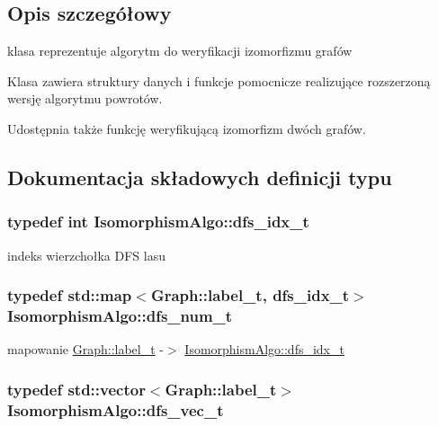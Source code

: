 \subsection{Opis szczegółowy}
klasa reprezentuje algorytm do weryfikacji izomorfizmu grafów 

Klasa zawiera struktury danych i funkcje pomocnicze realizujące rozszerzoną wersję algorytmu powrotów.

Udostępnia także funkcję weryfikującą izomorfizm dwóch grafów. 

\subsection{Dokumentacja składowych definicji typu}
\hypertarget{classIsomorphismAlgo_ab4ec6489271a99fae3bd2476b22ef35b}{
\subsubsection[{dfs\-\_\-idx\-\_\-t}]{\setlength{\rightskip}{0pt plus 5cm}typedef int {\bf Isomorphism\-Algo\-::dfs\-\_\-idx\-\_\-t}\hspace{0.3cm}{\ttfamily [private]}}}\label{classIsomorphismAlgo_ab4ec6489271a99fae3bd2476b22ef35b}


indeks wierzchołka D\-F\-S lasu 

\hypertarget{classIsomorphismAlgo_a848c1d965a1c201d768513f756629bbe}{
\subsubsection[{dfs\-\_\-num\-\_\-t}]{\setlength{\rightskip}{0pt plus 5cm}typedef std\-::map$<${\bf Graph\-::label\-\_\-t}, {\bf dfs\-\_\-idx\-\_\-t}$>$ {\bf Isomorphism\-Algo\-::dfs\-\_\-num\-\_\-t}\hspace{0.3cm}{\ttfamily [private]}}}\label{classIsomorphismAlgo_a848c1d965a1c201d768513f756629bbe}


mapowanie \hyperlink{classGraph_a2237a0ada8484c37b8200c0e3685ca71}{Graph\-::label\-\_\-t} -\/$>$ \hyperlink{classIsomorphismAlgo_ab4ec6489271a99fae3bd2476b22ef35b}{Isomorphism\-Algo\-::dfs\-\_\-idx\-\_\-t} 

\hypertarget{classIsomorphismAlgo_a906dbedec7eb2192c4a8963323031704}{
\subsubsection[{dfs\-\_\-vec\-\_\-t}]{\setlength{\rightskip}{0pt plus 5cm}typedef std\-::vector$<${\bf Graph\-::label\-\_\-t}$>$ {\bf Isomorphism\-Algo\-::dfs\-\_\-vec\-\_\-t}\hspace{0.3cm}{\ttfamily [private]}}}\label{classIsomorphismAlgo_a906dbedec7eb2192c4a8963323031704}


